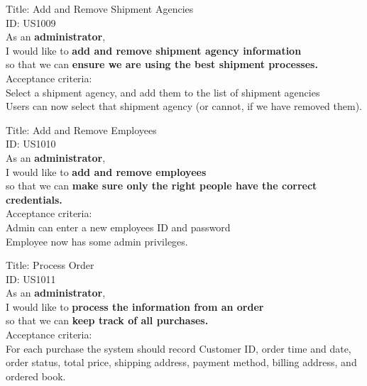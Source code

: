 \documentclass{article}
\begin{document}
\begin{framed}
\noindent
Title: Add and Remove Shipment Agencies\\
ID: US1009 \\
As an \textbf{administrator},\\
 \textbullet  \quad \quad I would like to \textbf{add and remove shipment agency information}\\ 
 \textbullet  \quad \quad so that we can \textbf{ensure we are using the best shipment processes.}\\
 Acceptance criteria: \\
  \textbullet  \quad \quad Select a shipment agency, and add them to the list of shipment agencies\\
  \textbullet  \quad \quad Users can now select that shipment agency (or cannot, if we have removed them).
\end{framed}


\begin{framed}
\noindent
Title: Add and Remove Employees\\
ID: US1010 \\
As an \textbf{administrator},\\
 \textbullet  \quad \quad I would like to \textbf{add and remove employees}\\ 
 \textbullet  \quad \quad so that we can \textbf{make sure only the right people have the correct credentials.}\\
 Acceptance criteria: \\
  \textbullet  \quad \quad Admin can enter a new employees ID and password\\
  \textbullet  \quad \quad Employee now has some admin privileges.
\end{framed}

\begin{framed}
\noindent
Title: Process Order\\
ID: US1011 \\
As an \textbf{administrator},\\
 \textbullet  \quad \quad I would like to \textbf{process the information from an order}\\ 
 \textbullet  \quad \quad so that we can \textbf{keep track of all purchases.}\\
 Acceptance criteria: \\
  \textbullet  \quad \quad For each purchase the system should record Customer  ID,  order time and date, order status, total price, shipping address, payment method, billing address, and ordered book.
\end{framed}
\end{document}
